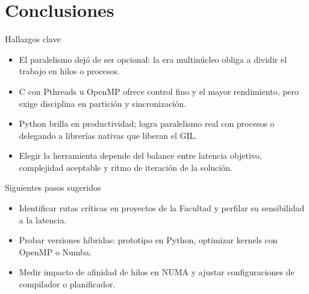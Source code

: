 \section{Conclusiones}

\begin{frame}{Hallazgos clave}
  \begin{itemize}
    \item El paralelismo dejó de ser opcional: la era multinúcleo obliga a dividir el trabajo en hilos o procesos.
    \item C con Pthreads u OpenMP ofrece control fino y el mayor rendimiento, pero exige disciplina en partición y sincronización.
    \item Python brilla en productividad; logra paralelismo real con procesos o delegando a librerías nativas que liberan el GIL.
    \item Elegir la herramienta depende del balance entre latencia objetivo, complejidad aceptable y ritmo de iteración de la solución.
  \end{itemize}
\end{frame}

\begin{frame}{Siguientes pasos sugeridos}
  \begin{itemize}
    \item Identificar rutas críticas en proyectos de la Facultad y perfilar su sensibilidad a la latencia.
    \item Probar versiones híbridas: prototipo en Python, optimizar kernels con OpenMP o Numba.
    \item Medir impacto de afinidad de hilos en NUMA y ajustar configuraciones de compilador o planificador.
  \end{itemize}
\end{frame}

